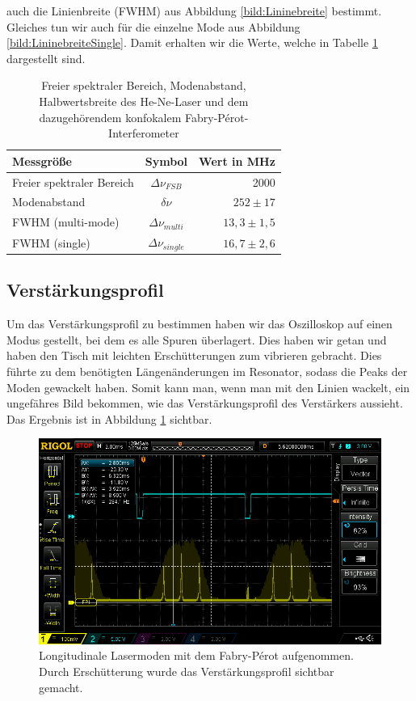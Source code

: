 auch die Linienbreite (FWHM) aus Abbildung \ref{bild:Lininebreite} bestimmt. Gleiches tun wir auch für die einzelne Mode
aus Abbildung \ref{bild:LininebreiteSingle}. Damit erhalten wir die Werte, welche in Tabelle \ref{tab:Linienbreite} dargestellt sind.

\begin{table}
    \centering
 
    \begin{tabular}{lcr}
        \toprule
        Messgröße & Symbol & Wert in MHz\\
        \midrule
        Freier spektraler Bereich& $\Delta \nu_{FSB}$ & 2000\\
        Modenabstand& $\delta\nu$& $252 \pm 17$\\
        FWHM (multi-mode)& $\Delta\nu_{multi}$&$13,3 \pm 1,5$\\
        FWHM (single)& $\Delta\nu_{single}$&$16,7 \pm 2,6$\\
        \bottomrule        
    \end{tabular}
  
    \caption{Freier spektraler Bereich, Modenabstand, Halbwertsbreite des He-Ne-Laser und dem dazugehörendem 
    konfokalem Fabry-Pérot-Interferometer}
    \label{tab:Linienbreite}
\end{table}


\subsection*{Verstärkungsprofil}

Um das Verstärkungsprofil zu bestimmen haben wir das Oszilloskop auf einen Modus gestellt, bei dem es alle Spuren 
überlagert. Dies haben wir getan und haben den Tisch mit leichten Erschütterungen zum vibrieren gebracht.
Dies führte zu dem benötigten Längenänderungen im Resonator, sodass die Peaks der Moden gewackelt haben.
Somit kann man, wenn man mit den Linien wackelt, ein ungefähres Bild bekommen, wie das Verstärkungsprofil
des Verstärkers aussieht. Das Ergebnis ist in Abbildung \ref{bild:Verstaerkung} sichtbar.

\begin{figure}[h]
    \centering
    \includegraphics[width = \linewidth]{Bilder/Auswertung/FabryPerotVerst.png}
    \caption{Longitudinale Lasermoden mit dem Fabry-Pérot aufgenommen. Durch Erschütterung wurde das Verstärkungsprofil sichtbar gemacht.}
    \label{bild:Verstaerkung}
\end{figure}

